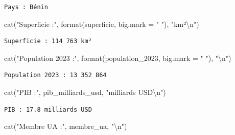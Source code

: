 \documentclass[
  french,
  11pt,
  a4paper,
]{article}
\newenvironment{Shaded}{}{}
\newcommand{\AttributeTok}[1]{\textcolor[rgb]{0.84,0.23,0.29}{#1}}
\newcommand{\FunctionTok}[1]{\textcolor[rgb]{0.44,0.26,0.76}{#1}}
\newcommand{\NormalTok}[1]{\textcolor[rgb]{0.14,0.16,0.18}{#1}}
\newcommand{\SpecialCharTok}[1]{\textcolor[rgb]{0.00,0.36,0.77}{#1}}
\newcommand{\StringTok}[1]{\textcolor[rgb]{0.01,0.18,0.38}{#1}}
\begin{document}
\begin{verbatim}
Pays : Bénin 
\end{verbatim}

\begin{Shaded}
\begin{Highlighting}[]
\FunctionTok{cat}\NormalTok{(}\StringTok{"Superficie :"}\NormalTok{, }\FunctionTok{format}\NormalTok{(superficie, }\AttributeTok{big.mark =} \StringTok{" "}\NormalTok{), }\StringTok{"km²}\SpecialCharTok{\textbackslash{}n}\StringTok{"}\NormalTok{)}
\end{Highlighting}
\end{Shaded}

\begin{verbatim}
Superficie : 114 763 km²
\end{verbatim}

\begin{Shaded}
\begin{Highlighting}[]
\FunctionTok{cat}\NormalTok{(}\StringTok{"Population 2023 :"}\NormalTok{, }\FunctionTok{format}\NormalTok{(population\_2023, }\AttributeTok{big.mark =} \StringTok{" "}\NormalTok{), }\StringTok{"}\SpecialCharTok{\textbackslash{}n}\StringTok{"}\NormalTok{)}
\end{Highlighting}
\end{Shaded}

\begin{verbatim}
Population 2023 : 13 352 864 
\end{verbatim}

\begin{Shaded}
\begin{Highlighting}[]
\FunctionTok{cat}\NormalTok{(}\StringTok{"PIB :"}\NormalTok{, pib\_milliards\_usd, }\StringTok{"milliards USD}\SpecialCharTok{\textbackslash{}n}\StringTok{"}\NormalTok{)}
\end{Highlighting}
\end{Shaded}

\begin{verbatim}
PIB : 17.8 milliards USD
\end{verbatim}

\begin{Shaded}
\begin{Highlighting}[]
\FunctionTok{cat}\NormalTok{(}\StringTok{"Membre UA :"}\NormalTok{, membre\_ua, }\StringTok{"}\SpecialCharTok{\textbackslash{}n}\StringTok{"}\NormalTok{)}
\end{Highlighting}
\end{Shaded}
\end{document}
